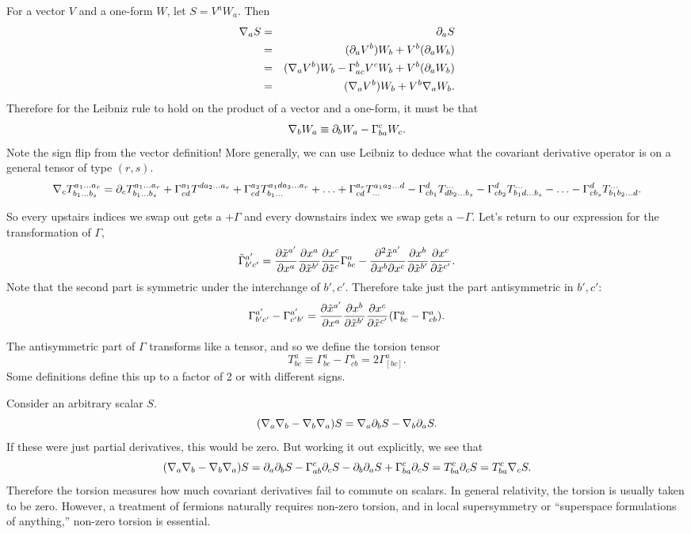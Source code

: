 For a vector $V$ and a one-form $W$, let $S=V^a W_a$. Then
\begin{eqnarray*}
\nabla_a S&=& \partial_a S\\
&=& (\partial_a V^b)W_b+ V^b(\partial_a W_b)\\
&=& (\nabla_a V^b)W_b- \Gamma^b_{ac} V^c W_b+V^b(\partial_a W_b)\\
&=& (\nabla_a V^b)W_b+ V^b \nabla_a W_b.
\end{eqnarray*}
Therefore for the Leibniz rule to hold on the product of a vector and a one-form, it must be that
$$\nabla_b W_a \equiv \partial_b W_a - \Gamma^c_{ba}W_c.$$
Note the sign flip from the vector definition! More generally, we can use Leibniz to deduce what the covariant derivative operator is on a general tensor of type $(r,s)$.
$$\nabla_c T^{a_1\ldots a_r}_{b_1\ldots b_s} = \partial_c T^{a_1\ldots a_r}_{b_1\ldots b_s}+ 
\Gamma^{a_1}_{cd} T^{da_2 \ldots a_r}+\Gamma^{a_2}_{cd} T^{a_1 d a_3 \ldots a_r}_{b_1\ldots}+\ldots + \Gamma^{a_r}_{cd}T^{a_1a_2\ldots d}_{\ldots} - \Gamma^d_{cb_1}T^{\ldots}_{db_2 \ldots b_s}- \Gamma^d_{cb_2} T^{\ldots}_{b_1 d \ldots b_s}-\ldots - \Gamma^d_{cb_s} T^{\ldots}_{b_1 b_2 \ldots d}.$$

So every upstairs indices we swap out gets a $+\Gamma$ and every downstairs index we swap gets a $-\Gamma$. Let's return to our expression for the transformation of $\Gamma,$
$$\tilde \Gamma^{a'}_{b'c'}=\frac{\partial \tilde x^{a'}}{\partial x^a} \frac{ \partial x^a}{\partial \tilde x^{b'}}\frac{\partial x^c}{\partial \tilde x^c} \Gamma^a_{bc}-\frac{\partial^2 \tilde x^{a'}}{\partial x^b \partial x^c}\frac{\partial x^b}{\partial \tilde x^{b'}}\frac{\partial x^c}{\partial\tilde x^{c'}}.$$
Note that the second part is symmetric under the interchange of $b',c'$. Therefore take just the part antisymmetric in $b',c'$:
$$\Gamma^{a'}_{b'c'}-\Gamma^{a'}_{c'b'}=\frac{\partial \tilde x^{a'}}{\partial x^a}\frac{\partial x^b}{\partial \tilde x^{b'}}\frac{\partial x^c}{\partial \tilde x^{c'}}(\Gamma^a_{bc}-\Gamma^a_{cb}).$$
\begin{defn}
The antisymmetric part of $\Gamma$ transforms like a tensor, and so we define the torsion tensor
$$T^a_{bc}\equiv\Gamma^a_{bc}-\Gamma^a_{cb}=2\Gamma^a_{[bc]}.$$
Some definitions define this up to a factor of 2 or with different signs.
\end{defn}

Consider an arbitrary scalar $S$.
$$(\nabla_a \nabla_b-\nabla_b\nabla_a)S= \nabla_a \partial_b S- \nabla_b \partial_a S.$$
If these were just partial derivatives, this would be zero. But working it out explicitly, we see that 
$$(\nabla_a \nabla_b-\nabla_b\nabla_a)S=\partial_a \partial_b S-\Gamma^c_{ab}\partial_c S -\partial_b \partial_a S + \Gamma^c_{ba}\partial_c S = T^c_{ba} \partial_c S = T^c_{ba}\nabla_c S.$$
Therefore the torsion measures how much covariant derivatives fail to commute on scalars. In general relativity, the torsion is usually taken to be zero. However, a treatment of fermions naturally requires non-zero torsion, and in local supersymmetry or ``superspace formulations of anything,'' non-zero torsion is essential.

